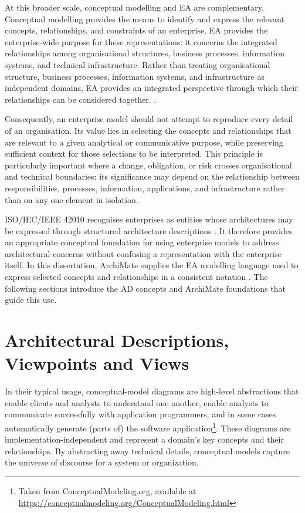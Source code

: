 At this broader scale, conceptual modelling and \ac{EA} are complementary. Conceptual modelling provides the means to identify and express the relevant concepts, relationships, and constraints of an enterprise. \ac{EA} provides the enterprise-wide purpose for these representations: it concerns the integrated relationships among organisational structures, business processes, information systems, and technical infrastructure. Rather than treating organisational structure, business processes, information systems, and infrastructure as independent domains, \ac{EA} provides an integrated perspective through which their relationships can be considered together. \cite{LankhorstEtAl2004}.

Consequently, an enterprise model should not attempt to reproduce every detail of an organisation. Its value lies in selecting the concepts and relationships that are relevant to a given analytical or communicative purpose, while preserving sufficient context for those selections to be interpreted. This principle is particularly important where a change, obligation, or risk crosses organisational and technical boundaries: its significance may depend on the relationship between responsibilities, processes, information, applications, and infrastructure rather than on any one element in isolation.

ISO/IEC/IEEE 42010 recognises enterprises as entities whose architectures may be expressed through structured architecture descriptions \cite{ISO42010:2022}. It therefore provides an appropriate conceptual foundation for using enterprise models to address architectural concerns without confusing a representation with the enterprise itself. In this dissertation, ArchiMate supplies the \ac{EA} modelling language used to express selected concepts and relationships in a consistent notation \cite{opengroup}. The following sections introduce the \ac{AD} concepts and ArchiMate foundations that guide this use.

\section{Architectural Descriptions, Viewpoints and Views}

In their typical usage, conceptual-model diagrams are high-level abstractions that enable clients and analysts to understand one another, enable analysts to communicate successfully with application programmers, and in some cases automatically generate (parts of) the software application\footnote{\label{fn:conceptual_modelling_conference}Taken from ConceptualModeling.org, available at \url{https://conceptualmodeling.org/ConceptualModeling.html}}.
These diagrams are implementation-independent and represent a domain's key concepts and their relationships. By abstracting away technical details, conceptual models capture the universe of discourse for a system or organization.

